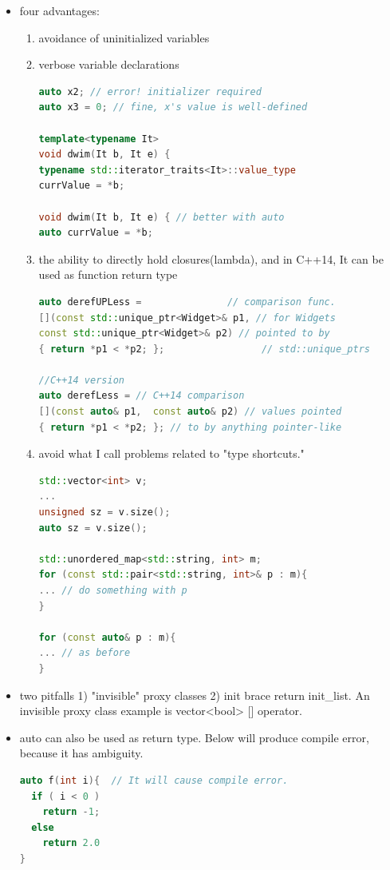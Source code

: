 \documentclass[a4paper,12pt,twoside]{book}
\begin{document}
\begin{itemize}
\item four advantages:
\begin{enumerate}
\item avoidance of uninitialized variables
\item verbose variable declarations
\begin{lstlisting}[frame=single, language=c++]
auto x2; // error! initializer required
auto x3 = 0; // fine, x's value is well-defined

template<typename It>
void dwim(It b, It e) {
typename std::iterator_traits<It>::value_type
currValue = *b;

void dwim(It b, It e) { // better with auto
auto currValue = *b;
\end{lstlisting}

\item the ability to directly hold closures(lambda), and in C++14, It can be used as function return type
\begin{lstlisting}[frame=single, language=c++]
auto derefUPLess =               // comparison func.
[](const std::unique_ptr<Widget>& p1, // for Widgets
const std::unique_ptr<Widget>& p2) // pointed to by
{ return *p1 < *p2; };                 // std::unique_ptrs

//C++14 version
auto derefLess = // C++14 comparison
[](const auto& p1,  const auto& p2) // values pointed
{ return *p1 < *p2; }; // to by anything pointer-like
\end{lstlisting}

\item avoid what I call problems related to "type shortcuts."
\begin{lstlisting}[frame=single, language=c++]
std::vector<int> v;
...
unsigned sz = v.size();
auto sz = v.size();

std::unordered_map<std::string, int> m;
for (const std::pair<std::string, int>& p : m){
... // do something with p
}

for (const auto& p : m){
... // as before
}
\end{lstlisting}
\end{enumerate}

\item two pitfalls 1) "invisible" proxy classes 2) init brace return init\_list. An invisible proxy class example is vector<bool> [] operator.

\item auto can also be used as return type. Below will produce compile error, because it has ambiguity.
\begin{lstlisting}[frame=single, language=c++]
auto f(int i){  // It will cause compile error.
  if ( i < 0 )
    return -1;
  else
    return 2.0
}
\end{lstlisting}


\end{itemize}
\end{document}
